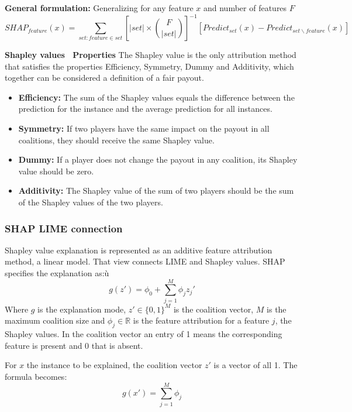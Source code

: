 \textbf{General formulation:}
Generalizing for any feature $x$ and number of features $F$
\begin{equation*}
    SHAP_{feature}(x)=\sum_{set:feature\in{}set}{[|set|\times\binom{F}{|set|}]}^{-1}[Predict_{set}(x)-Predict_{set\backslash{}feature}(x)]
\end{equation*}

\textbf{Shapley values \ Properties}
The Shapley value is the only attribution method that satisfies the properties Efficiency, Symmetry, Dummy and Additivity, which together can be considered a definition of a fair payout.
\begin{itemize}
    \item \textbf{Efficiency:} The sum of the Shapley values equals the difference between the prediction for the instance and the average prediction for all instances.
    \item \textbf{Symmetry:} If two players have the same impact on the payout in all coalitions, they should receive the same Shapley value.
    \item \textbf{Dummy:} If a player does not change the payout in any coalition, its Shapley value should be zero.
    \item \textbf{Additivity:} The Shapley value of the sum of two players should be the sum of the Shapley values of the two players.
\end{itemize}

\subsubsection{SHAP \- LIME connection}
Shapley value explanation is represented as an additive feature attribution method, a linear model. That view connects LIME and Shapley values. SHAP specifies the explanation as:ù
\begin{equation*}
    g(z')=\phi_0+\sum_{j=1}^M\phi_jz_j'
\end{equation*}
Where $g$ is the explanation mode, $z'\in\{0,1\}^M$ is the coalition vector, $M$ is the maximum coalition size and $\phi_j\in\mathbb{R}$ is the feature attribution for a feature $j$, the Shapley values.
In the coalition vector an entry of 1 means the corresponding feature is present and 0 that is absent.

For $x$ the instance to be explained, the coalition vector $z'$ is a vector of all 1. The formula becomes:
\begin{equation*}
    g(x')=\sum_{j=1}^M\phi_j
\end{equation*}

